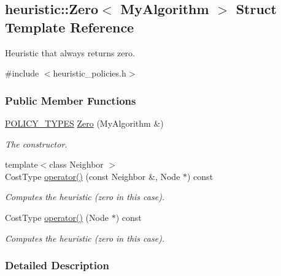 \hypertarget{structheuristic_1_1Zero}{}\subsection{heuristic\+:\+:Zero$<$ My\+Algorithm $>$ Struct Template Reference}
\label{structheuristic_1_1Zero}


Heuristic that always returns zero.  




{\ttfamily \#include $<$heuristic\+\_\+policies.\+h$>$}

\subsubsection*{Public Member Functions}
\begin{DoxyCompactItemize}
\item 
\hyperlink{extensions_2shared__policies_2headers_8h_ae70a06fa4631780beea14971eb36a562}{P\+O\+L\+I\+C\+Y\+\_\+\+T\+Y\+P\+ES} \hyperlink{structheuristic_1_1Zero_a52ce89debbfc5b7624e6ebb129ac8379}{Zero} (My\+Algorithm \&)\hypertarget{structheuristic_1_1Zero_a52ce89debbfc5b7624e6ebb129ac8379}{}\label{structheuristic_1_1Zero_a52ce89debbfc5b7624e6ebb129ac8379}

\begin{DoxyCompactList}\small\item\em The constructor. \end{DoxyCompactList}\item 
{\footnotesize template$<$class Neighbor $>$ }\\Cost\+Type \hyperlink{structheuristic_1_1Zero_acb03d5579e2625d4f7b9379f8e8a836c}{operator()} (const Neighbor \&, Node $\ast$) const 
\begin{DoxyCompactList}\small\item\em Computes the heuristic (zero in this case). \end{DoxyCompactList}\item 
Cost\+Type \hyperlink{structheuristic_1_1Zero_a68a7d62a51719c1f5282e697f748e509}{operator()} (Node $\ast$) const 
\begin{DoxyCompactList}\small\item\em Computes the heuristic (zero in this case). \end{DoxyCompactList}\end{DoxyCompactItemize}


\subsubsection{Detailed Description}
